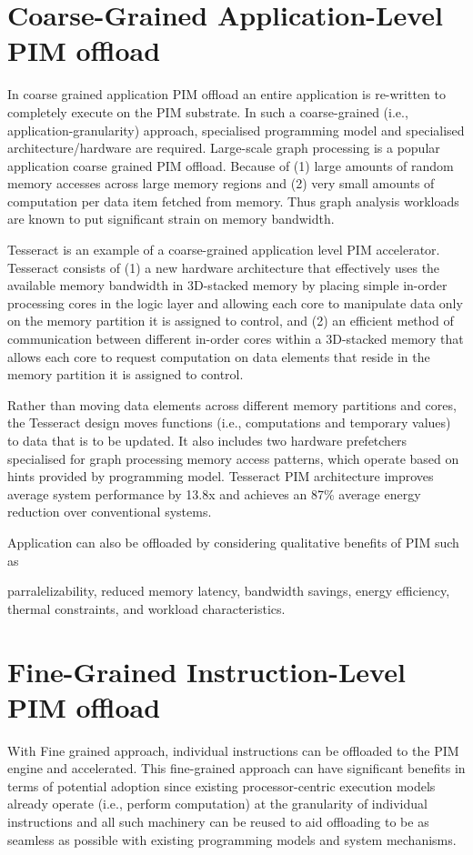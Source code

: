 \documentclass[a4paper,12pt, final]{report}
\begin{document}
\section{Coarse-Grained Application-Level PIM offload}

In coarse grained application PIM offload an entire application is re-written to
completely execute on the PIM substrate. In such a coarse-grained
(i.e., application-granularity) approach,  specialised
programming model and specialised architecture/hardware are required. Large-scale graph
processing is a popular application coarse grained PIM offload. Because of (1) large amounts of
random memory accesses across large memory regions and (2) very small amounts
of computation per data item fetched from memory. Thus graph analysis workloads are
known to put significant strain on memory bandwidth.

Tesseract\cite{tesseract} is an example of a coarse-grained application level PIM accelerator.
Tesseract consists of (1) a new hardware architecture that effectively uses the
available memory bandwidth in 3D-stacked memory by placing simple in-order
processing cores in the logic layer and allowing each core to manipulate data
only on the memory partition it is assigned to control, and (2) an efficient
method of communication between different in-order cores within a 3D-stacked
memory that allows each core to request computation on data elements that
reside in the memory partition it is assigned to control.


Rather than moving data elements across different memory partitions and cores,
the Tesseract design moves functions (i.e., computations and temporary values)
to data that is to be updated. It also includes two hardware prefetchers
specialised for graph processing memory access patterns, which operate based on
hints provided by programming model. 
Tesseract PIM architecture improves average system
performance by 13.8x and achieves an 87\% average energy reduction over conventional systems.

Application can also be offloaded by considering qualitative benefits of PIM such as

parralelizability\cite{inmemmap51}, reduced memory
latency\cite{pointerchasing32}, 
bandwidth savings\cite{tom31}, energy efficiency\cite{energyefficient40}, thermal 
constraints\cite{coolpim47}, and workload characteristics\cite{fafnir12}.  

\section{Fine-Grained Instruction-Level PIM offload}
With Fine grained approach,
individual instructions can be offloaded to the PIM engine and accelerated.
This fine-grained approach can have significant benefits in terms of potential adoption 
since existing processor-centric execution models already operate (i.e., perform computation) 
at the granularity of individual instructions and all such machinery
can be reused to aid offloading to be as seamless as
possible with existing programming models and system
mechanisms. 
\end{document}
